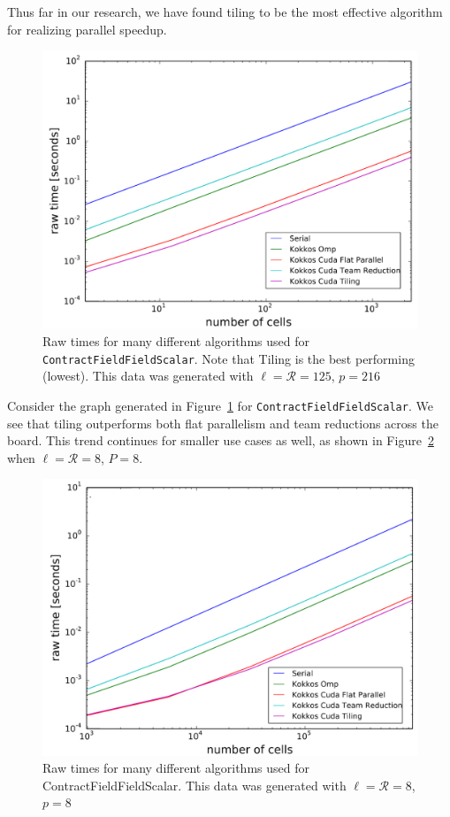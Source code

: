 Thus far in our research, we have found tiling to be the most effective
algorithm for realizing parallel speedup. 

\begin{figure}[H]
    \centering
\includegraphics[scale = 1]{CFFS_RawTimes_LR125P216_2.PNG} 
\caption[\texttt{ContractFieldFieldScalar} performance summary (large)]{Raw times
    for many different algorithms used for \texttt{ContractFieldFieldScalar}.
    Note that Tiling is the best performing (lowest). This data was generated
    with
    $\ell=\mathcal{R}=125$, $p=216$}
\label{fig:TilingPerformance}
\end{figure}
Consider the graph generated in Figure~\ref{fig:TilingPerformance} for \texttt{ContractFieldFieldScalar}. We see that tiling outperforms both flat parallelism and team reductions across the board. This trend continues for smaller use cases as well, as shown in Figure~\ref{fig:TilingPerformance2} when $\ell = \mathcal{R} = 8$, $P = 8$.

\begin{figure}[H]
    \centering
    \includegraphics[scale = 1]{CFFS_RawTimes_LRP8_2.PNG}
    \caption[\texttt{ContractFieldFieldScalar} performance summary (small)]{Raw
        times for many different algorithms used for ContractFieldFieldScalar.
        This data was generated with $\ell=\mathcal{R}=8$, $p=8$}
\label{fig:TilingPerformance2}
\end{figure}

